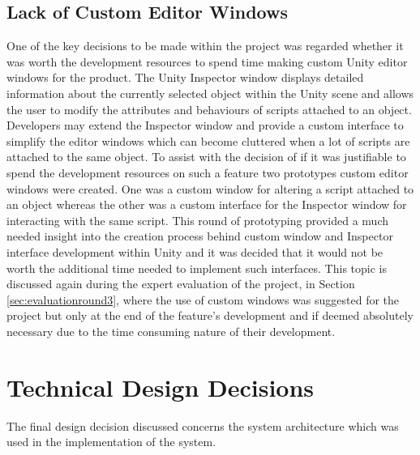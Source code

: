\documentclass{l4proj}
\begin{document}
\subsection{Lack of Custom Editor Windows}
\label{sec:designnoeditorwindows}
One of the key decisions to be made within the project was regarded whether it was worth the development resources to spend time making custom Unity editor windows for the product. The Unity Inspector window displays detailed information about the currently selected object within the Unity scene and allows the user to modify the attributes and behaviours of scripts attached to an object. Developers may extend the Inspector window and provide a custom interface to simplify the editor windows which can become cluttered when a lot of scripts are attached to the same object. To assist with the decision of if it was justifiable to spend the development resources on such a feature two prototypes custom editor windows were created. One was a custom window for altering a script attached to an object whereas the other was a custom interface for the Inspector window for interacting with the same script. This round of prototyping provided a much needed insight into the creation process behind custom window and Inspector interface development within Unity and it was decided that it would not be worth the additional time needed to implement such interfaces. This topic is discussed again during the expert evaluation of the project, in Section \ref{sec:evaluationround3}, where the use of custom windows was suggested for the project but only at the end of the feature's development and if deemed absolutely necessary due to the time consuming nature of their development. 

\section{Technical Design Decisions}
The final design decision discussed concerns the system architecture which was used in the implementation of the system. 
\end{document}

